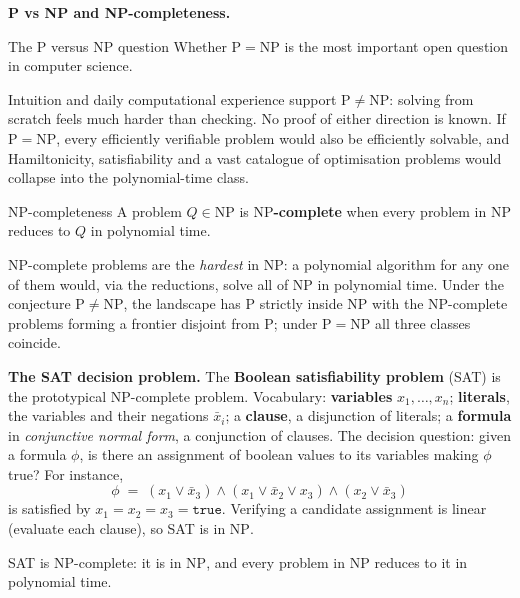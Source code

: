 \textbf{P vs NP and NP-completeness.}
\begin{notebox}{The $\mathrm{P}$ versus $\mathrm{NP}$ question}
Whether $\mathrm{P} = \mathrm{NP}$ is the most important open question in computer science.
\end{notebox}
Intuition and daily computational experience support $\mathrm{P} \neq \mathrm{NP}$: solving from scratch feels much harder than checking. No proof of either direction is known. If $\mathrm{P} = \mathrm{NP}$, every efficiently verifiable problem would also be efficiently solvable, and Hamiltonicity, satisfiability and a vast catalogue of optimisation problems would collapse into the polynomial-time class.
\begin{definitionbox}{$\mathrm{NP}$-completeness}
A problem $Q \in \mathrm{NP}$ is \textbf{$\mathrm{NP}$-complete} when every problem in $\mathrm{NP}$ reduces to $Q$ in polynomial time.
\end{definitionbox}
$\mathrm{NP}$-complete problems are the \emph{hardest} in $\mathrm{NP}$: a polynomial algorithm for any one of them would, via the reductions, solve all of $\mathrm{NP}$ in polynomial time. Under the conjecture $\mathrm{P} \neq \mathrm{NP}$, the landscape has $\mathrm{P}$ strictly inside $\mathrm{NP}$ with the $\mathrm{NP}$-complete problems forming a frontier disjoint from $\mathrm{P}$; under $\mathrm{P} = \mathrm{NP}$ all three classes coincide.

\textbf{The SAT decision problem.} The \textbf{Boolean satisfiability problem} (SAT) is the prototypical $\mathrm{NP}$-complete problem. Vocabulary: \textbf{variables} $x_1, \dots, x_n$; \textbf{literals}, the variables and their negations $\bar{x}_i$; a \textbf{clause}, a disjunction of literals; a \textbf{formula} in \emph{conjunctive normal form}, a conjunction of clauses. The decision question: given a formula $\phi$, is there an assignment of boolean values to its variables making $\phi$ true? For instance,
\[
  \phi \;=\; (x_1 \lor \bar{x}_3) \land (x_1 \lor \bar{x}_2 \lor x_3) \land (x_2 \lor \bar{x}_3)
\]
is satisfied by $x_1 = x_2 = x_3 = \texttt{true}$. Verifying a candidate assignment is linear (evaluate each clause), so SAT is in $\mathrm{NP}$.

\begin{theorem}
SAT is $\mathrm{NP}$-complete: it is in $\mathrm{NP}$, and every problem in $\mathrm{NP}$ reduces to it in polynomial time.
\end{theorem}

